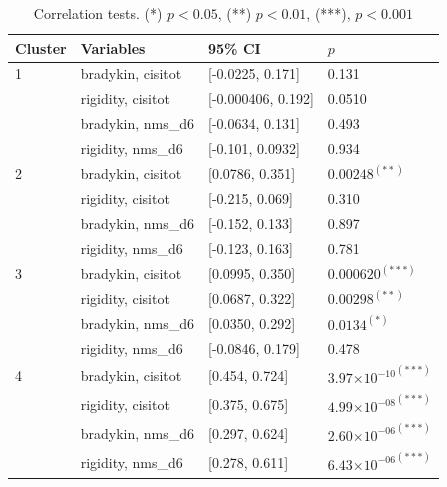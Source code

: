 \documentclass[10pt]{article}
\providecommand{\e}[1]{\ensuremath{\times 10^{#1}}}
\begin{document}
\begin{table}[h]
  \centering
  \begin{tabular}{l|l|l|l}
 Cluster & Variables & 95\% CI & $p$ \\
    \hline
1 & bradykin, cisitot&[-0.0225, 0.171]&0.131 \\
  & rigidity, cisitot&[-0.000406, 0.192]&0.0510 \\
  & bradykin, nms\_d6&[-0.0634, 0.131]&0.493 \\
  & rigidity, nms\_d6&[-0.101, 0.0932]&0.934 \\
  \hline
2 & bradykin, cisitot&[0.0786, 0.351]&$0.00248^{(**)}$ \\
  & rigidity, cisitot&[-0.215, 0.069]&0.310 \\
  & bradykin, nms\_d6&[-0.152, 0.133]&0.897 \\
  & rigidity, nms\_d6&[-0.123, 0.163]&0.781 \\
  \hline
3 & bradykin, cisitot&[0.0995, 0.350]&$0.000620^{(***)}$ \\
  & rigidity, cisitot&[0.0687, 0.322]&$0.00298^{(**)}$ \\
  & bradykin, nms\_d6&[0.0350, 0.292]&$0.0134^{(*)}$ \\
  & rigidity, nms\_d6&[-0.0846, 0.179]&0.478 \\
  \hline
  4 & bradykin, cisitot&[0.454, 0.724]&${3.97\e{-10}}^{(***)}$ \\
& rigidity, cisitot&[0.375, 0.675]&${4.99\e{-08}}^{(***)}$ \\
  & bradykin, nms\_d6&[0.297, 0.624]&${2.60\e{-06}}^{(***)}$ \\
  & rigidity, nms\_d6&[0.278, 0.611]&${6.43\e{-06}}^{(***)}$ \\
  \end{tabular}
  \caption{Correlation tests. (*) $p < 0.05$, (**) $p < 0.01$, (***), $p < 0.001$}
  \label{tab:cortests}
\end{table}
\end{document}
